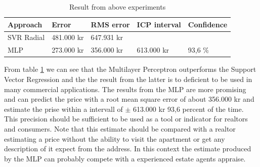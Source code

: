\begin{table}[H]
\begin{threeparttable}
\begin{tabular}{ | l | l | l | l | l | }
\hline
 Approach & Error & RMS error & ICP interval & Confidence \\
\hline
SVR Radial & 481.000 kr &  647.931 kr  &  &  \\
MLP & 273.000 kr & 356.000 kr & 613.000 kr & 93,6 \% \\
\hline
\end{tabular}
\caption{Result from above experiments}
\label{tab:result_in_sek}
\end{threeparttable}
\end{table}

From table \ref{tab:result_in_sek} we can see that the Multilayer Perceptron outperforms the Support Vector Regression and the the result from the latter is to deficient to be used in many commercial applications. The results from the MLP are more promising and can predict the price with a root mean square error of about 356.000 kr and estimate the prise within a intervall of $\pm$ 613.000 kr 93,6 percent of the time. This precision should be sufficient to be used as a tool or indicator for realtors and consumers. Note that this estimate should be compared with a realtor estimating a price without the ability to visit the apartment or get any description of it expect from the address. In this context the estimate produced by the MLP can probably compete with a experienced estate agents appraise. 






